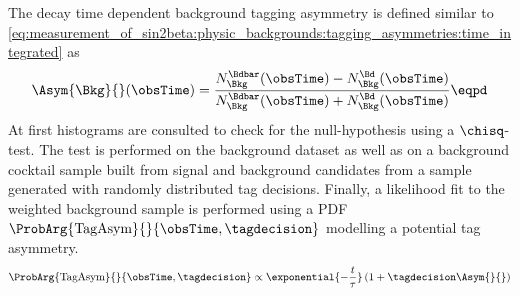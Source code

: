 The decay time dependent background tagging asymmetry is defined similar to 
\cref{eq:measurement_of_sin2beta:physic_backgrounds:tagging_asymmetries:time_integrated} as
%
\begin{equation}\label{eq:measurement_of_sin2beta:physic_backgrounds:tagging_asymmetries:time_dependent}
  \Asym{\Bkg}{}(\obsTime) = \frac{N_{\Bkg}^{\Bdbar}(\obsTime) - N_{\Bkg}^{\Bd}(\obsTime)}{N_{\Bkg}^{\Bdbar}(\obsTime) + N_{\Bkg}^{\Bd}(\obsTime)}\eqpd
\end{equation}
%
At first histograms are consulted to check for the null-hypothesis using a
$\chisq$-test. The test is performed on the background \sweighted dataset as
well as on a background \sweighted cocktail \MC sample built from signal \MC and
background candidates from a \ToyMC sample generated with randomly distributed
tag decisions. Finally, a likelihood fit to the weighted background sample is
performed using a \ac{PDF} $\ProbArg{\text{TagAsym}}{}{\obsTime, \tagdecision}$
modelling a potential tag asymmetry.
%
\begin{equation}\label{eq:measurement_of_sin2beta:physic_backgrounds:tagging_asymmetries:time_dependent:pdf}
  \ProbArg{\text{TagAsym}}{}{\obsTime, \tagdecision} \propto \exponential{- \frac{t}{\tau}} \left( 1 + \tagdecision \Asym{}{} \right)
\end{equation}

